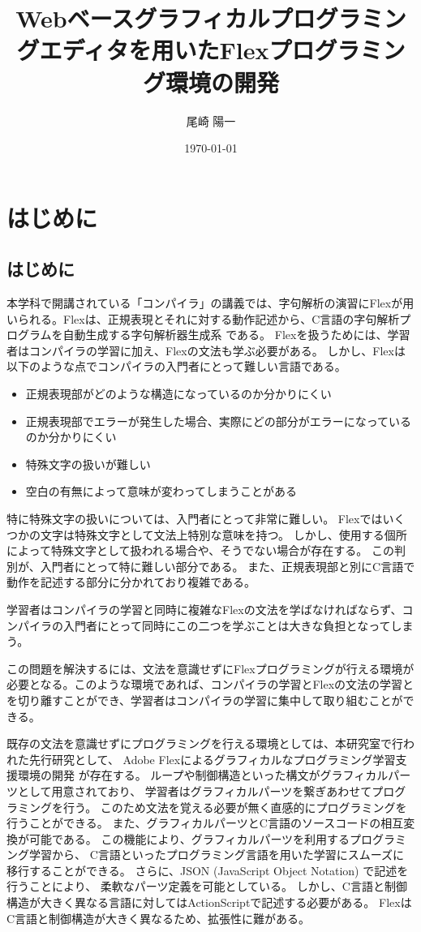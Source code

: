 \documentclass{risepaper}
\title {Webベースグラフィカルプログラミングエディタを用いたFlexプログラミング環境の開発}
\author{尾崎 陽一}
\date{\today}
\begin{document}
 
\maketitle
                                                          
\chapter{はじめに}
\section{はじめに}

本学科で開講されている「コンパイラ」の講義では、字句解析の演習にFlexが用いられる。Flexは、正規表現とそれに対する動作記述から、C言語の字句解析プログラムを自動生成する字句解析器生成系
である。
Flexを扱うためには、学習者はコンパイラの学習に加え、Flexの文法も学ぶ必要がある。
しかし、Flexは以下のような点でコンパイラの入門者にとって難しい言語である。

\begin{itemize}
\item 正規表現部がどのような構造になっているのか分かりにくい
\item 正規表現部でエラーが発生した場合、実際にどの部分がエラーになっているのか分かりにくい
\item 特殊文字の扱いが難しい
\item 空白の有無によって意味が変わってしまうことがある
\end{itemize}

特に特殊文字の扱いについては、入門者にとって非常に難しい。
Flexではいくつかの文字は特殊文字として文法上特別な意味を持つ。
しかし、使用する個所によって特殊文字として扱われる場合や、そうでない場合が存在する。
この判別が、入門者にとって特に難しい部分である。
また、正規表現部と別にC言語で動作を記述する部分に分かれており複雑である。

学習者はコンパイラの学習と同時に複雑なFlexの文法を学ばなければならず、コンパイラの入門者にとって同時にこの二つを学ぶことは大きな負担となってしまう。

この問題を解決するには、文法を意識せずにFlexプログラミングが行える環境が必要となる。このような環境であれば、コンパイラの学習とFlexの文法の学習とを切り離すことができ、学習者はコンパイラの学習に集中して取り組むことができる。

既存の文法を意識せずにプログラミングを行える環境としては、本研究室で行われた先行研究として、
Adobe Flexによるグラフィカルなプログラミング学習支援環境の開発 \cite{Thesis01,Thesis02}が存在する。
ループや制御構造といった構文がグラフィカルパーツとして用意されており、
学習者はグラフィカルパーツを繋ぎあわせてプログラミングを行う。
このため文法を覚える必要が無く直感的にプログラミングを行うことができる。
また、グラフィカルパーツとC言語のソースコードの相互変換が可能である。
この機能により、グラフィカルパーツを利用するプログラミング学習から、
C言語といったプログラミング言語を用いた学習にスムーズに移行することができる。
さらに、JSON (JavaScript Object Notation) で記述を行うことにより、
柔軟なパーツ定義を可能としている。
しかし、C言語と制御構造が大きく異なる言語に対してはActionScriptで記述する必要がある。
FlexはC言語と制御構造が大きく異なるため、拡張性に難がある。
\end{document}
